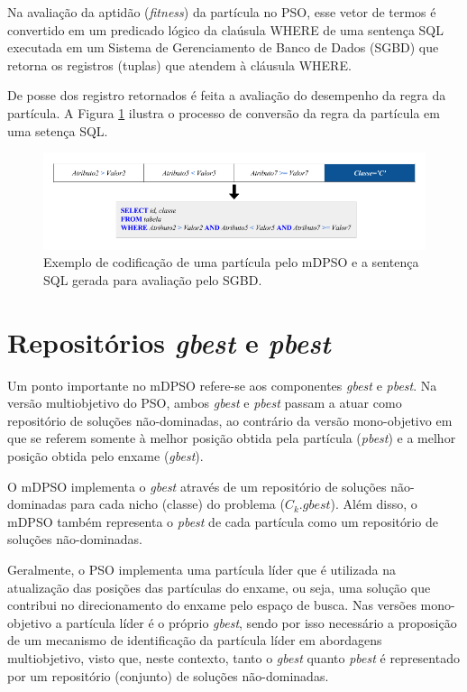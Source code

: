 \documentclass[
	12pt,				%
	openany,			%
	oneside,	
	a4paper,			%
	brazil,				%
	]{unimontes-ppgmsc-abntex2}
\begin{document}
Na avaliação da aptidão ({\em fitness}) da partícula no PSO, esse vetor de termos é convertido em um predicado lógico da claúsula WHERE de uma sentença SQL executada em um Sistema de Gerenciamento de Banco de Dados (SGBD) que retorna os registros (tuplas) que atendem à cláusula WHERE. 

De posse dos registro retornados é feita a avaliação do desempenho da regra da partícula. A Figura \ref{fig:representacao} ilustra o processo de conversão da regra da partícula em uma setença SQL. 

\begin{figure}[ht]
\centering
\includegraphics[scale=.5]{img/representacao}
\caption{Exemplo de codificação de uma partícula pelo mDPSO e a sentença SQL gerada para avaliação pelo SGBD.}
\label{fig:representacao}
\end{figure}

\section{Repositórios {\em gbest} e {\em pbest}}
\label{sec:rep_best}

Um ponto importante no mDPSO refere-se aos componentes {\em gbest} e {\em pbest}. Na versão multiobjetivo do PSO, ambos {\em gbest} e {\em pbest} passam a atuar como repositório de soluções não-dominadas, ao contrário da versão mono-objetivo em que se referem somente à melhor posição obtida pela partícula ({\em pbest}) e a melhor posição obtida pelo enxame ({\em gbest}).

O mDPSO implementa o {\em gbest} através de um repositório de soluções não-dominadas para cada nicho (classe) do problema  ($C_k.gbest$). Além disso, o mDPSO também representa o {\em pbest} de cada partícula como um repositório de soluções não-dominadas.  

Geralmente, o PSO implementa uma partícula líder que é utilizada na atualização das posições das partículas do enxame, ou seja, uma solução que contribui no direcionamento do enxame pelo espaço de busca. Nas versões mono-objetivo a partícula líder é o próprio {\em gbest}, sendo por isso necessário a proposição de um mecanismo de identificação da partícula líder em abordagens multiobjetivo, visto que, neste contexto, tanto o {\em gbest} quanto {\em pbest} é representado por um repositório (conjunto) de soluções não-dominadas. 
\end{document}
